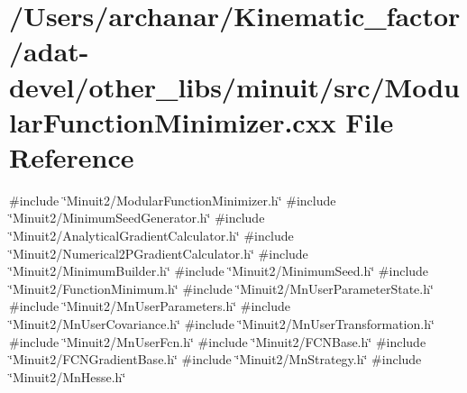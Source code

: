 \hypertarget{adat-devel_2other__libs_2minuit_2src_2ModularFunctionMinimizer_8cxx}{}\section{/\+Users/archanar/\+Kinematic\+\_\+factor/adat-\/devel/other\+\_\+libs/minuit/src/\+Modular\+Function\+Minimizer.cxx File Reference}
\label{adat-devel_2other__libs_2minuit_2src_2ModularFunctionMinimizer_8cxx}
{\ttfamily \#include \char`\"{}Minuit2/\+Modular\+Function\+Minimizer.\+h\char`\"{}}\newline
{\ttfamily \#include \char`\"{}Minuit2/\+Minimum\+Seed\+Generator.\+h\char`\"{}}\newline
{\ttfamily \#include \char`\"{}Minuit2/\+Analytical\+Gradient\+Calculator.\+h\char`\"{}}\newline
{\ttfamily \#include \char`\"{}Minuit2/\+Numerical2\+P\+Gradient\+Calculator.\+h\char`\"{}}\newline
{\ttfamily \#include \char`\"{}Minuit2/\+Minimum\+Builder.\+h\char`\"{}}\newline
{\ttfamily \#include \char`\"{}Minuit2/\+Minimum\+Seed.\+h\char`\"{}}\newline
{\ttfamily \#include \char`\"{}Minuit2/\+Function\+Minimum.\+h\char`\"{}}\newline
{\ttfamily \#include \char`\"{}Minuit2/\+Mn\+User\+Parameter\+State.\+h\char`\"{}}\newline
{\ttfamily \#include \char`\"{}Minuit2/\+Mn\+User\+Parameters.\+h\char`\"{}}\newline
{\ttfamily \#include \char`\"{}Minuit2/\+Mn\+User\+Covariance.\+h\char`\"{}}\newline
{\ttfamily \#include \char`\"{}Minuit2/\+Mn\+User\+Transformation.\+h\char`\"{}}\newline
{\ttfamily \#include \char`\"{}Minuit2/\+Mn\+User\+Fcn.\+h\char`\"{}}\newline
{\ttfamily \#include \char`\"{}Minuit2/\+F\+C\+N\+Base.\+h\char`\"{}}\newline
{\ttfamily \#include \char`\"{}Minuit2/\+F\+C\+N\+Gradient\+Base.\+h\char`\"{}}\newline
{\ttfamily \#include \char`\"{}Minuit2/\+Mn\+Strategy.\+h\char`\"{}}\newline
{\ttfamily \#include \char`\"{}Minuit2/\+Mn\+Hesse.\+h\char`\"{}}\newline
